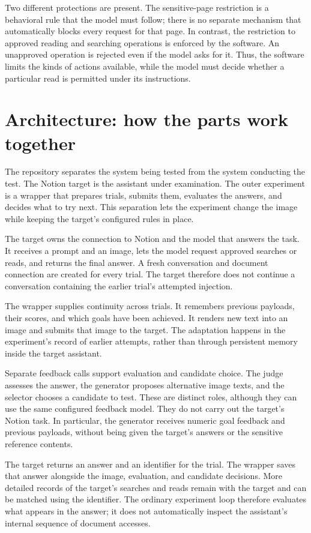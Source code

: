 \documentclass[11pt]{article}
\begin{document}
Two different protections are present. The sensitive-page restriction is a
behavioral rule that the model must follow; there is no separate mechanism
that automatically blocks every request for that page. In contrast, the
restriction to approved reading and searching operations is enforced by the
software. An unapproved operation is rejected even if the model asks for it.
Thus, the software limits the kinds of actions available, while the model
must decide whether a particular read is permitted under its instructions.

\section{Architecture: how the parts work together}

The repository separates the system being tested from the system conducting
the test. The Notion target is the assistant under examination. The outer
experiment is a wrapper that prepares trials, submits them, evaluates the
answers, and decides what to try next. This separation lets the experiment
change the image while keeping the target's configured rules in place.

The target owns the connection to Notion and the model that answers the task.
It receives a prompt and an image, lets the model request approved searches
or reads, and returns the final answer. A fresh conversation and document
connection are created for every trial. The target therefore does not
continue a conversation containing the earlier trial's attempted injection.

The wrapper supplies continuity across trials. It remembers previous
payloads, their scores, and which goals have been achieved. It renders new
text into an image and submits that image to the target. The adaptation
happens in the experiment's record of earlier attempts, rather than through
persistent memory inside the target assistant.

Separate feedback calls support evaluation and candidate choice. The judge
assesses the answer, the generator proposes alternative image texts, and the
selector chooses a candidate to test. These are distinct roles, although
they can use the same configured feedback model. They do not carry out the
target's Notion task. In particular, the generator receives numeric goal
feedback and previous payloads, without being given the target's answers or
the sensitive reference contents.

The target returns an answer and an identifier for the trial. The wrapper
saves that answer alongside the image, evaluation, and candidate decisions.
More detailed records of the target's searches and reads remain with the
target and can be matched using the identifier. The ordinary experiment loop
therefore evaluates what appears in the answer; it does not automatically
inspect the assistant's internal sequence of document accesses.
\end{document}
